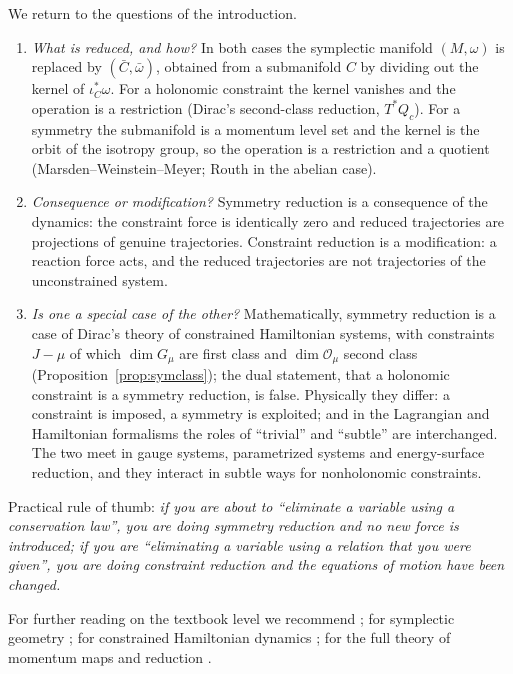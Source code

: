 \documentclass[11pt,a4paper]{article}
\numberwithin{equation}{section}
\theoremstyle{plain}
\theoremstyle{definition}
\theoremstyle{remark}
\begin{document}
We return to the questions of the introduction.

\begin{enumerate}[label=(Q\arabic*)]
\item \emph{What is reduced, and how?} In both cases the symplectic manifold $(M,\omega)$ is replaced by $(\bar C,\bar\omega)$, obtained from a submanifold $C$ by dividing out the kernel of $\iota_C^*\omega$. For a holonomic constraint the kernel vanishes and the operation is a restriction (Dirac's second-class reduction, $T^*Q_c$). For a symmetry the submanifold is a momentum level set and the kernel is the orbit of the isotropy group, so the operation is a restriction and a quotient (Marsden--Weinstein--Meyer; Routh in the abelian case).
\item \emph{Consequence or modification?} Symmetry reduction is a consequence of the dynamics: the constraint force is identically zero and reduced trajectories are projections of genuine trajectories. Constraint reduction is a modification: a reaction force acts, and the reduced trajectories are not trajectories of the unconstrained system.
\item \emph{Is one a special case of the other?} Mathematically, symmetry reduction is a case of Dirac's theory of constrained Hamiltonian systems, with constraints $J-\mu$ of which $\dim G_\mu$ are first class and $\dim\mathcal O_\mu$ second class (Proposition~\ref{prop:symclass}); the dual statement, that a holonomic constraint is a symmetry reduction, is false. Physically they differ: a constraint is imposed, a symmetry is exploited; and in the Lagrangian and Hamiltonian formalisms the roles of ``trivial'' and ``subtle'' are interchanged. The two meet in gauge systems, parametrized systems and energy-surface reduction, and they interact in subtle ways for nonholonomic constraints.
\end{enumerate}

Practical rule of thumb: \emph{if you are about to ``eliminate a variable using a conservation law'', you are doing symmetry reduction and no new force is introduced; if you are ``eliminating a variable using a relation that you were given'', you are doing constraint reduction and the equations of motion have been changed.}

For further reading on the textbook level we recommend \cite{goldstein2002,landau1976,lanczos1970,arnold1989,josesaletan1998}; for symplectic geometry \cite{guilleminsternberg1984,libermannmarle1987,souriau1970,cannas2001}; for constrained Hamiltonian dynamics \cite{sundermeyer1982,henneaux1992,gnh1978}; for the full theory of momentum maps and reduction \cite{am1978,marsden1992,mr1999,op2004,mmopr2007}.
\end{document}
